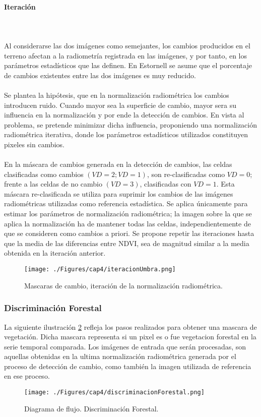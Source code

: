 \paragraph{Iteraci\'on}\mbox{}\\\mbox{}\\
Al considerarse las dos im\'agenes como semejantes, los cambios producidos en el terreno afectan a la radiometría registrada en las imágenes, y por tanto, en los parámetros estadísticos que las definen. En Estornell\cite{estornell2004analisis} se asume que el porcentaje de cambios existentes entre las dos im\'agenes es muy reducido.\\~\\
Se plantea la hip\'otesis, que en la normalizaci\'on radiom\'etrica los cambios introducen ruido. Cuando mayor sea la superficie de cambio, mayor sera su influencia en la normalizaci\'on y por ende la detecci\'on de cambios. En vista al problema, se pretende minimizar dicha influencia, proponiendo una normalizaci\'on radiom\'etrica iterativa, donde los par\'ametros estad\'isticos utilizados constituyen pixeles sin cambios. \\~\\
En la máscara de cambios generada en la detección de cambios, las celdas clasificadas como cambios $ (VD = 2; VD = 1) $, son re-clasificadas como $ VD=0 $; frente a las celdas de no cambio $(VD = 3)  $, clasificadas con $ VD=1 $. Esta máscara re-clasificada se utiliza para suprimir los cambios de las im\'agenes radiom\'etricas utilizadas como referencia estad\'istica. Se aplica \'unicamente para estimar los par\'ametros de normalizaci\'on radiom\'etrica; la imagen sobre la que se aplica la normalizaci\'on ha de mantener todas las
celdas, independientemente de que se consideren como cambios a priori. Se propone repetir las iteraciones hasta que la media de las diferencias entre NDVI, sea de magnitud similar a la media obtenida en la iteraci\'on anterior. 
	\begin{figure}[H]
		\centering
		\texttt{[image: ./Figures/cap4/iteracionUmbra.png]}
		\caption{Mascaras de cambio, iteraci\'on de la normalizaci\'on radiom\'etrica.}
		\label{fig:umbrales}
	\end{figure}


\subsubsection{Discriminaci\'on Forestal}
La siguiente ilustraci\'on \ref{fig:discrimForestal} refleja los pasos realizados para obtener una mascara de vegetaci\'on. Dicha mascara representa si un pixel es o fue vegetacion forestal en la serie temporal comparada. Los im\'agenes de entrada que ser\'an procesadas, son aquellas obtenidas en la ultima normalizaci\'on radiom\'etrica generada por el proceso de detecci\'on de cambio, como tambi\'en la imagen utilizada de referencia en ese proceso.
\begin{figure}[H]
	\centering
	\texttt{[image: ./Figures/cap4/discriminacionForestal.png]}
	\caption{Diagrama de flujo. Discriminaci\'on Forestal.}
	\label{fig:discrimForestal}
\end{figure}

